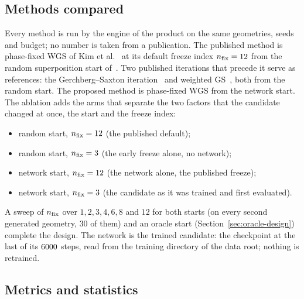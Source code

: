 \subsection{Methods compared}\label{sec:compared}

Every method is run by the engine of the product on the same geometries, seeds and budget; no number is taken from a publication. The published method is phase-fixed WGS of Kim et al.~\cite{kim2019} at its default freeze index $n_{\mathrm{fix}}=12$ from the random superposition start of~\cite{dileonardo}. Two published iterations that precede it serve as references: the Gerchberg--Saxton iteration~\cite{gs1972} and weighted GS~\cite{dileonardo}, both from the random start. The proposed
method is phase-fixed WGS from the network start. The ablation adds the arms that separate the two factors that the candidate changed at once, the start and the freeze index:
\begin{itemize}
\item random start, $n_{\mathrm{fix}}=12$ (the published default);
\item random start, $n_{\mathrm{fix}}=3$ (the early freeze alone, no network);
\item network start, $n_{\mathrm{fix}}=12$ (the network alone, the published freeze);
\item network start, $n_{\mathrm{fix}}=3$ (the candidate as it was trained and first evaluated).
\end{itemize}
A sweep of $n_{\mathrm{fix}}$ over $1,2,3,4,6,8$ and $12$ for both starts (on every second generated geometry, $30$ of them) and an oracle start (Section~\ref{sec:oracle-design}) complete the design. The network is the trained candidate: the checkpoint at the last of its $6000$ steps, read from the training directory of the data root; nothing is retrained.

\subsection{Metrics and statistics}\label{sec:stats}

